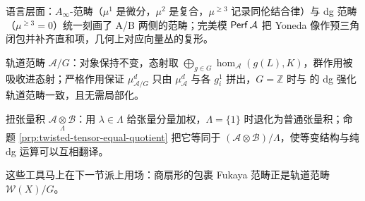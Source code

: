 \begin{keytakeaways}
\item 语言层面：$A_{\infty}$-范畴（$\mu^1$ 是微分，$\mu^2$ 是复合，$\mu^{\geq 3}$ 记录同伦结合律）与 dg 范畴（$\mu^{\geq 3}=0$）统一刻画了 A/B 两侧的范畴；完美模 $\operatorname{\mathsf{Perf}}\mathcal{A}$ 把 Yoneda 像作预三角闭包并补齐直和项，几何上对应向量丛的复形。
\item 轨道范畴 $\mathcal{A}/G$：对象保持不变，态射取 $\bigoplus_{g\in G}\hom_{\mathcal{A}}(g(L),K)$，群作用被吸收进态射；严格作用保证 $\mu^d_{\mathcal{A}/G}$ 只由 $\mu^d_{\mathcal{A}}$ 与各 $g_i^1$ 拼出，$G=\mathbb{Z}$ 时与 \cite{FKQ24} 的 dg 强化轨道范畴一致，且无需局部化。
\item 扭张量积 $\mathcal{A}\underset{\Lambda}{\otimes}\mathcal{B}$：用 $\lambda\in\Lambda$ 给张量分量加权，$\Lambda=\{1\}$ 时退化为普通张量积；命题 \ref{prp:twisted-tensor-equal-quotient} 把它等同于 $(\mathcal{A}\otimes\mathcal{B})/\Lambda$，使等变结构与纯 dg 运算可以互相翻译。
\item 这些工具马上在下一节派上用场：商扇形的包裹 Fukaya 范畴正是轨道范畴 $\mathcal{W}(X)/G$。
\end{keytakeaways}
